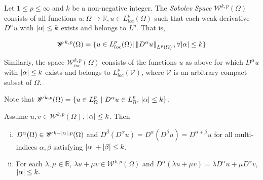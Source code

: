 \begin{defn}
	Let $1\leq p \leq \infty$ and $k$ be a non-negative integer. The \textit{Sobolev Space} $\mathscr{W}^{k,p}(\Omega)$ consists of all functions $u : \Omega \to \mathbb{R}, u \in L^{p}_{loc} (\Omega)$ such that each weak
derivative $D^{\alpha}u$ with $\vert\alpha\vert\leq k$ exists and belongs to $L^p$. That is,

	\begin{equation}
		\mathscr{W}^{k,p}(\Omega) = \{u \in L^{p}_{loc}(\Omega) \vert \left\lVert D^{\alpha}u\right\rVert_{L^p(\Omega)}, \forall \vert\alpha\vert\leq k\}
	\end{equation}


	Similarly, the space $\mathscr{W}^{k,p}_{loc}(\Omega)$
consists of the functions $u$ as above for which $D^\alpha u$ with $\vert\alpha\vert \leq k$ exists and belongs to $L^{p}_{loc}(\mathscr{V})$, where $\mathscr{V}$ is an arbitrary compact subset of $\Omega$.
\end{defn}
\begin{remark}
	Note that $\mathscr{W}^{k,p}(\Omega) = \{ u\in L^{p}_{\Omega} \text{ | } D^\alpha u \in L^{p}_{\Omega}\text{, } \vert\alpha\vert \leq k\}$.
\end{remark}
\begin{thm}
	Assume $u, v \in \mathscr{W}^{k,p}(\Omega)$,
$\vert\alpha\vert \leq k$. Then

	\begin{enumerate}[i.]
		\item $D^{\alpha}(\Omega) \in \mathscr{W}^{k-\vert\alpha\vert,p}(\Omega)$ and $D^{\beta}(D^{\alpha}u) = D^\alpha(D^\beta u) = D^{\alpha+\beta}u$ for all multi-indices $\alpha, \beta$ satisfying $\vert\alpha\vert + \vert\beta\vert\leq k$.

		\item  For each $\lambda, \mu \in \mathbb{R}$, $\lambda u + \mu v \in \mathscr{W}^{k,p}(\Omega)$ and $D^\alpha(\lambda u + \mu v) = \lambda D^\alpha u + \mu D^\alpha v$,
$\vert\alpha\vert \leq k.$
	\end{enumerate}
\end{thm}

